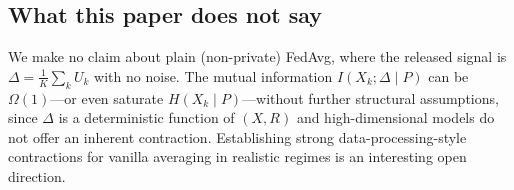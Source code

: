 \subsection{What this paper does not say}
We make no claim about plain (non-private) FedAvg, where the released signal is \(\Delta=\tfrac{1}{K}\sum_k U_k\) with no noise. The mutual information \(I(X_k;\Delta\mid P)\) can be \(\Omega(1)\)---or even saturate \(H(X_k\mid P)\)---without further structural assumptions, since \(\Delta\) is a deterministic function of \((X,R)\) and high-dimensional models do not offer an inherent contraction. Establishing strong data-processing-style contractions for vanilla averaging in realistic regimes is an interesting open direction.
